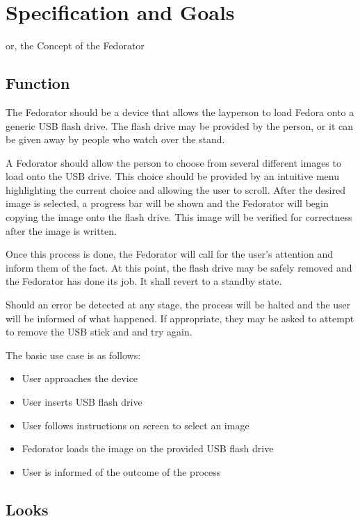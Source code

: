\chapter{Specification and Goals}
    or, the Concept of the Fedorator
    \section{Function}
        
        The Fedorator should be a device that allows the layperson to load Fedora onto a generic USB flash drive.  The flash drive may be provided by the person, or it can be given away by people who watch over the stand.
        
        A Fedorator should allow the person to choose from several different images to load onto the USB drive.  This choice should be provided by an intuitive menu highlighting the current choice and allowing the user to scroll.  After the desired image is selected, a progress bar will be shown and the Fedorator will begin copying the image onto the flash drive.  This image will be verified for correctness after the image is written.
        
        Once this process is done, the Fedorator will call for the user's attention and inform them of the fact.  At this point, the flash drive may be safely removed and the Fedorator has done its job.  It shall revert to a standby state.
        
        Should an error be detected at any stage, the process will be halted and the user will be informed of what happened.  If appropriate, they may be asked to attempt to remove the USB stick and  and try again.
        
        The basic use case is as follows:
        
        \begin{itemize}
            \item User approaches the device
            \item User inserts USB flash drive
            \item User follows instructions on screen to select an image
            \item Fedorator loads the image on the provided USB flash drive
            \item User is informed of the outcome of the process
        \end{itemize}
    \section{Looks}
        
